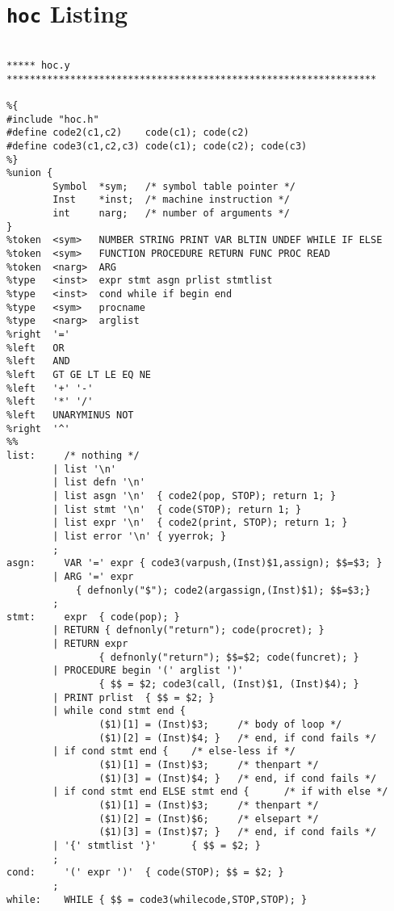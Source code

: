 \chapter{\texttt{hoc} Listing}

\begin{verbatim}

***** hoc.y ****************************************************************

%{
#include "hoc.h"
#define code2(c1,c2)    code(c1); code(c2)
#define code3(c1,c2,c3) code(c1); code(c2); code(c3)
%}
%union {
        Symbol  *sym;   /* symbol table pointer */
        Inst    *inst;  /* machine instruction */
        int     narg;   /* number of arguments */
}
%token  <sym>   NUMBER STRING PRINT VAR BLTIN UNDEF WHILE IF ELSE
%token  <sym>   FUNCTION PROCEDURE RETURN FUNC PROC READ
%token  <narg>  ARG
%type   <inst>  expr stmt asgn prlist stmtlist
%type   <inst>  cond while if begin end 
%type   <sym>   procname
%type   <narg>  arglist
%right  '='
%left   OR
%left   AND
%left   GT GE LT LE EQ NE
%left   '+' '-'
%left   '*' '/'
%left   UNARYMINUS NOT 
%right  '^'
%%
list:     /* nothing */
        | list '\n'
        | list defn '\n'
        | list asgn '\n'  { code2(pop, STOP); return 1; }
        | list stmt '\n'  { code(STOP); return 1; } 
        | list expr '\n'  { code2(print, STOP); return 1; }
        | list error '\n' { yyerrok; }
        ;
asgn:     VAR '=' expr { code3(varpush,(Inst)$1,assign); $$=$3; }
        | ARG '=' expr
            { defnonly("$"); code2(argassign,(Inst)$1); $$=$3;}
        ;
stmt:     expr  { code(pop); }
        | RETURN { defnonly("return"); code(procret); }
        | RETURN expr
                { defnonly("return"); $$=$2; code(funcret); }
        | PROCEDURE begin '(' arglist ')'
                { $$ = $2; code3(call, (Inst)$1, (Inst)$4); }
        | PRINT prlist  { $$ = $2; }
        | while cond stmt end {
                ($1)[1] = (Inst)$3;     /* body of loop */
                ($1)[2] = (Inst)$4; }   /* end, if cond fails */
        | if cond stmt end {    /* else-less if */
                ($1)[1] = (Inst)$3;     /* thenpart */
                ($1)[3] = (Inst)$4; }   /* end, if cond fails */
        | if cond stmt end ELSE stmt end {      /* if with else */
                ($1)[1] = (Inst)$3;     /* thenpart */
                ($1)[2] = (Inst)$6;     /* elsepart */
                ($1)[3] = (Inst)$7; }   /* end, if cond fails */
        | '{' stmtlist '}'      { $$ = $2; }
        ;
cond:     '(' expr ')'  { code(STOP); $$ = $2; }
        ;
while:    WHILE { $$ = code3(whilecode,STOP,STOP); }

\end{verbatim}
